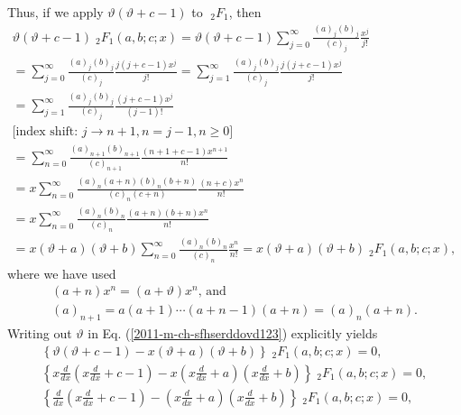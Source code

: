 {Thus, if we apply  $\vartheta (\vartheta +c-1)$ to ${\;}_2F_1$, then
\begin{equation}
\begin{split}
\vartheta (\vartheta +c-1) {\;}_2F_1 (a,b;c;x)
=  \vartheta (\vartheta +c-1) \sum_{j=0}^\infty  \frac{( a)_j( b)_j}{(c)_j} \frac{x^j}{j!}
\\
=   \sum_{j=0}^\infty  \frac{( a)_j( b)_j}{(c)_j} \frac{j(j+c-1)x^j}{j!}
=   \sum_{j=1}^\infty  \frac{( a)_j( b)_j}{(c)_j} \frac{j(j+c-1)x^j}{j!}
\\
=   \sum_{j=1}^\infty  \frac{( a)_j( b)_j}{(c)_j} \frac{ (j+c-1)x^j}{(j-1)!}
\\
\textrm{[index shift: } j\rightarrow n+1, n=j-1, n\ge 0\textrm{]}
\\
=   \sum_{n=0}^\infty  \frac{( a)_{n+1}( b)_{n+1}}{(c)_{n+1}} \frac{ ({n+1}+c-1)x^{n+1}}{n!}
\\
=  x \sum_{n=0}^\infty  \frac{( a)_{n}(a+n)( b)_{n}(b+n)}{(c)_{n}(c+n)} \frac{ ({n }+c)x^{n}}{n!}
\\
=  x\sum_{n=0}^\infty  \frac{( a)_{n}( b)_{n}}{(c)_{n}} \frac{(a+n) (b+n)x^{n}}{n!}
\\
=   x(\vartheta +a)(\vartheta +b)  \sum_{n=0}^\infty  \frac{( a)_{n}( b)_{n}}{(c)_{n}} \frac{x^{n}}{n!}
=   x(\vartheta +a)(\vartheta +b)  {\;}_2F_1(a,b;c;x)
,
\end{split}
\label{2011-m-ch-sfhserddovd123}
\end{equation}
where we have used
\begin{equation}
\begin{split}
(a+n)x^n = (a+ \vartheta )x^n \text{, and}   \\
(a)_{n+1}=a(a+1)\cdots (a+n-1)(a+n) =  (a)_{n}(a+n).
\end{split}
\end{equation}
Writing out $\vartheta$ in  Eq. (\ref{2011-m-ch-sfhserddovd123}) explicitly yields
\begin{equation}
\begin{split}
\left\{\vartheta (\vartheta +c-1)  -   x(\vartheta +a)(\vartheta +b)\right\}  {\;}_2F_1(a,b;c;x) =0,
   \\
\left\{x \frac{d}{dx} \left(x \frac{d}{dx} +c-1\right)    -   x\left(x \frac{d}{dx}+a\right)\left(x \frac{d}{dx} +b\right) \right\}  {\;}_2F_1(a,b;c;x) =0,
   \\
\left\{ \frac{d}{dx} \left(x \frac{d}{dx} +c-1\right)    -    \left(x \frac{d}{dx}+a\right)\left(x \frac{d}{dx} +b\right) \right\}  {\;}_2F_1(a,b;c;x) =0,
   \\

\end{split}
\end{equation}}
